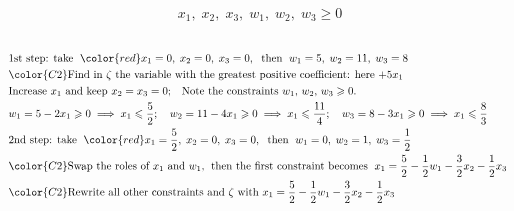 \documentclass[usenames,dvipsnames,8pt]{beamer}%
\begin{document}
\begin{frame}
\begin{columns}
\begin{column}{0.5\textwidth}
      \begin{align*}
        x_1,\;x_2,\;x_3,\;w_1,\;w_2,\;w_3\geqslant 0
      \end{align*}
    \end{column}
  \end{columns}
  \begin{align*}
    &\text{1st step: take }\;{\color{red}x_1 = 0,\;x_2 = 0,\; x_3 = 0},\;\text{ then }\;w_1 = 5,\;w_2 = 11,\;w_3 = 8 \\
    &{\color{C2}\text{Find in $\zeta$ the variable with the greatest positive coefficient: here $+5 x_1$}} \\
    &\text{Increase $x_1$ and keep $x_2 = x_3 = 0$;\quad Note the constraints $w_1,\,w_2,\,w_3\geqslant 0$.} \\
    &w_1 = 5-2x_1\geqslant 0\;\Longrightarrow\; x_1\leqslant\frac{5}{2};\quad w_2 = 11-4x_1\geqslant 0\;\Longrightarrow\; x_1\leqslant\frac{11}{4};\quad w_3 = 8-3x_1\geqslant 0\;\Longrightarrow\; x_1\leqslant\frac{8}{3}\\
    &\text{2nd step: take }\;{\color{red}x_1 = \frac{5}{2},\; x_2 = 0,\; x_3 = 0},\;\text{ then }\;w_1 = 0,\;w_2 = 1,\;w_3 = \frac{1}{2}\\
    &{\color{C2}\text{Swap the roles of $x_1$ and $w_1$,\;\text{ then the first constraint becomes }\;$x_1 = \frac{5}{2} - \frac{1}{2}w_1-\frac{3}{2} x_2-\frac{1}{2}x_3$ }} \\
    &{\color{C2}\text{Rewrite all other constraints and $\zeta$ with $x_1 = \frac{5}{2} - \frac{1}{2}w_1-\frac{3}{2} x_2-\frac{1}{2}x_3$ }} 
  \end{align*}
\end{frame}
\end{document}
